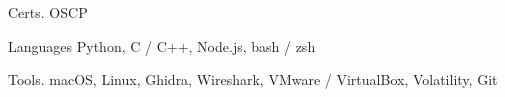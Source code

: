 
\begin{cvskills}
	\cvskill
	{Certs\hphantom{25}\color{white}.\hphantom{25}} %
	{OSCP} %

	\cvskill
	{Languages} %
	{Python, C / C++, Node.js, bash / zsh} %

	\cvskill
	{Tools\hphantom{25}\color{white}.\hphantom{25}} %
	{macOS, Linux, Ghidra, Wireshark, VMware / VirtualBox, Volatility, Git} %

\end{cvskills}
